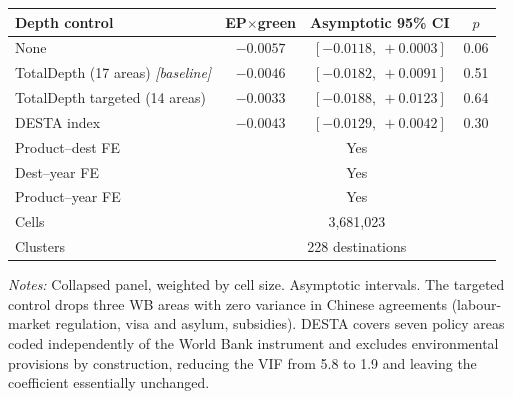 \small
\begin{threeparttable}
\begin{tabular}{lccc}
\toprule
Depth control & EP$\times$green & Asymptotic 95\% CI & $p$ \\
\midrule
None & $-0.0057$ & $[-0.0118,\ +0.0003]$ & 0.06 \\
TotalDepth (17 areas) \hfill\textit{[baseline]} & $-0.0046$ & $[-0.0182,\ +0.0091]$ & 0.51 \\
TotalDepth targeted (14 areas) & $-0.0033$ & $[-0.0188,\ +0.0123]$ & 0.64 \\
DESTA index & $-0.0043$ & $[-0.0129,\ +0.0042]$ & 0.30 \\
\midrule
Product--dest FE & \multicolumn{3}{c}{Yes} \\
Dest--year FE & \multicolumn{3}{c}{Yes} \\
Product--year FE & \multicolumn{3}{c}{Yes} \\
Cells & \multicolumn{3}{c}{3,681,023} \\
Clusters & \multicolumn{3}{c}{228 destinations} \\
\bottomrule
\end{tabular}
\begin{tablenotes}\footnotesize
\item \emph{Notes:} Collapsed panel, weighted by cell size. Asymptotic intervals. The targeted control drops three WB areas with zero variance in Chinese agreements (labour-market regulation, visa and asylum, subsidies). DESTA covers seven policy areas coded independently of the World Bank instrument and excludes environmental provisions by construction, reducing the VIF from 5.8 to 1.9 and leaving the coefficient essentially unchanged.
\end{tablenotes}
\end{threeparttable}
